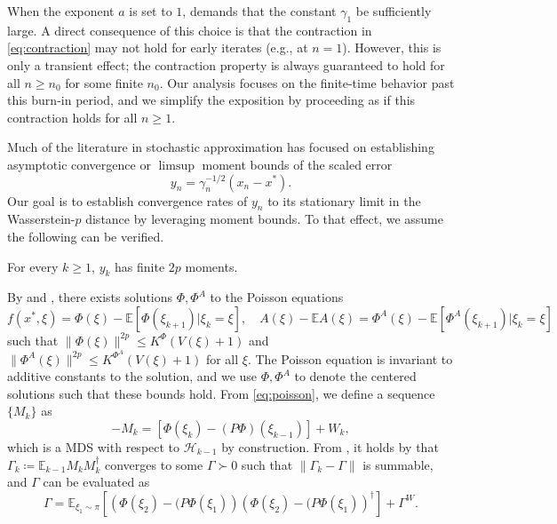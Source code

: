\documentclass[11pt]{article}
\begin{document}
When the \stepsize exponent $a$ is set to $1$,  demands that the constant $\gamma_1$ be sufficiently large. 
A direct consequence of this choice is that the contraction in \eqref{eq:contraction} may not hold for early iterates (e.g., at $n = 1$). 
However, this is only a transient effect; the contraction property is always guaranteed to hold for all $n \geq n_0$ for some finite $n_0$. 
Our analysis focuses on the finite-time behavior past this burn-in period, and we simplify the exposition by proceeding as if this contraction holds for all $n \geq 1$.




Much of the literature in stochastic approximation has focused on establishing asymptotic convergence or $\limsup$ moment bounds of the scaled error 
\begin{equation*}
    y_n = \gamma_n^{-1/2}(x_n - x^*)  .
\end{equation*}
Our goal is to establish convergence rates of $y_n$ to its stationary limit in the Wasserstein-$p$ distance by leveraging moment bounds. 
To that effect, we assume the following can be verified.
\begin{assumption}\label{ass:yn_moment}
    For every $k \geq 1$, $y_k$ has finite $2p$ moments.
\end{assumption}
By  and \citep[Theorem 17.4.2]{meyn2012markov}, there exists solutions $\Phi, \Phi^A$ to the Poisson equations
\begin{equation}\label{eq:poisson}
    f(x^*, \xi) = \Phi(\xi) - \mathbb{E}[\Phi(\xi_{k+1}) | \xi_k = \xi],
    \quad
    A(\xi) - \mathbb{E}A(\xi) = \Phi^A (\xi) - \mathbb{E}[\Phi^A (\xi_{k+1}) | \xi_k = \xi] 
\end{equation}
such that $\lVert \Phi(\xi) \rVert^{2p} \leq K^\Phi (V(\xi) + 1)$ and $\lVert \Phi^A (\xi)  \rVert^{2p} \leq K^{\Phi^A} (V(\xi)+ 1)$ for all $\xi$. 
The Poisson equation is invariant to additive constants to the solution, and we use $\Phi, \Phi^A$ to denote the centered solutions such that these bounds hold. 
From \eqref{eq:poisson}, we define a sequence $\{M_k\}$ as
\begin{equation}\label{eq:Mk}
    -M_k = [\Phi(\xi_{k}) - (P\Phi)(\xi_{k-1})] + W_k ,
\end{equation}
which is a MDS with respect to $\mathcal{H}_{k-1}$ by construction. 
From , it holds by \citep[Theorem 3]{srikant2024CLT} that $\Gamma_k \coloneqq \mathbb{E}_{k-1} M_k M_k^\dagger$ converges to some $\Gamma \succ 0$ such that $\lVert \Gamma_k - \Gamma\rVert$ is summable, and $\Gamma$ can be evaluated as
\begin{equation*}
    \Gamma = 
    \mathbb{E}_{\xi_1 \sim \pi} \left[ \left(\Phi(\xi_2) - (P \Phi(\xi_{1}) \right) \left(\Phi(\xi_2) - (P \Phi(\xi_{1}) \right)^\dagger \right]
    + \Gamma^W .
\end{equation*}
\end{document}

